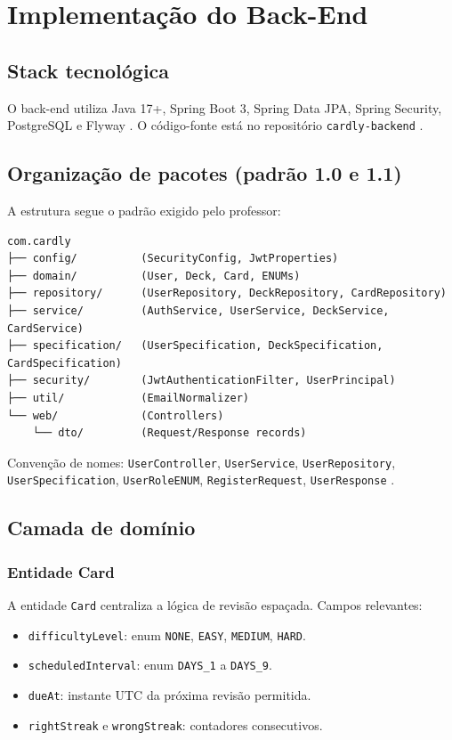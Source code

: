 \chapter{Implementação do Back-End}
\label{cap:backend}

\section{Stack tecnológica}

O back-end utiliza Java 17+, Spring Boot 3, Spring Data JPA, Spring Security, PostgreSQL e Flyway \cite{spring_boot_docs,postgresql_docs,flyway_docs}. O código-fonte está no repositório \texttt{cardly-backend} \cite{cardly_backend_repo}.

\section{Organização de pacotes (padrão 1.0 e 1.1)}

A estrutura segue o padrão exigido pelo professor:

\begin{verbatim}
com.cardly
├── config/          (SecurityConfig, JwtProperties)
├── domain/          (User, Deck, Card, ENUMs)
├── repository/      (UserRepository, DeckRepository, CardRepository)
├── service/         (AuthService, UserService, DeckService, CardService)
├── specification/   (UserSpecification, DeckSpecification, CardSpecification)
├── security/        (JwtAuthenticationFilter, UserPrincipal)
├── util/            (EmailNormalizer)
└── web/             (Controllers)
    └── dto/         (Request/Response records)
\end{verbatim}

Convenção de nomes: \texttt{UserController}, \texttt{UserService}, \texttt{UserRepository}, \texttt{UserSpecification}, \texttt{UserRoleENUM}, \texttt{RegisterRequest}, \texttt{UserResponse} \cite{youtube_spring_boot_api}.

\section{Camada de domínio}

\subsection{Entidade Card}

A entidade \texttt{Card} centraliza a lógica de revisão espaçada. Campos relevantes:
\begin{itemize}
    \item \texttt{difficultyLevel}: enum \texttt{NONE}, \texttt{EASY}, \texttt{MEDIUM}, \texttt{HARD}.
    \item \texttt{scheduledInterval}: enum \texttt{DAYS\_1} a \texttt{DAYS\_9}.
    \item \texttt{dueAt}: instante UTC da próxima revisão permitida.
    \item \texttt{rightStreak} e \texttt{wrongStreak}: contadores consecutivos.
\end{itemize}

